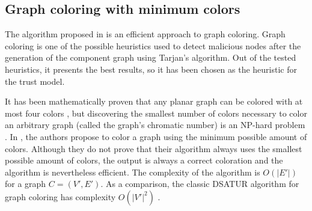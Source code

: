 \documentclass[conference]{IEEEtran}
\begin{document}
%
%
%
%		
%	
%
%

\subsection{Graph coloring with minimum colors}
\label{section:coloring}
The algorithm proposed in \cite{mittal2011graph} is an efficient approach to graph coloring.
Graph coloring is one of the possible heuristics used to detect malicious nodes after the generation of the component graph using Tarjan's algorithm.
Out of the tested heuristics, it presents the best results, so it has been chosen as the heuristic for the trust model.

It has been mathematically proven that any planar graph can be colored with at most four colors \cite{appel1976every}, but discovering the smallest number of colors necessary to color an arbitrary graph (called the graph's chromatic number) is an NP-hard problem \cite{sanchez1989determining}.
In \cite{mittal2011graph}, the authors propose to color a graph using the minimum possible amount of colors.
Although they do not prove that their algorithm always uses the smallest possible amount of colors, the output is always a correct coloration and the algorithm is nevertheless efficient.
The complexity of the algorithm is $O(|E'|)$ for a graph $C = (V',E')$.
As a comparison, the classic DSATUR algorithm for graph coloring has complexity $O(|V'|^2)$ \cite{brelaz1979new}.
\end{document}
